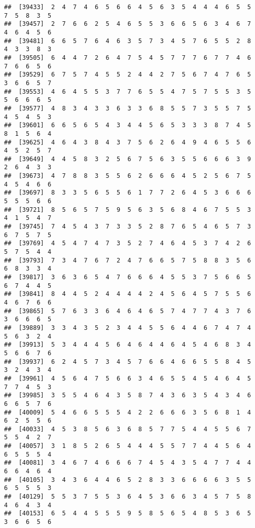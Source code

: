 \documentclass[
]{book}
\begin{document}
\begin{verbatim}
##  [39433]  2  4  7  4  6  5  6  6  4  5  6  3  5  4  4  4  6  5  5  7  5  8  3  5
##  [39457]  2  7  6  6  2  5  4  6  5  5  3  6  6  5  6  3  4  6  7  4  6  4  5  6
##  [39481]  6  6  5  7  6  4  6  3  5  7  3  4  5  7  6  5  5  2  8  4  3  3  8  3
##  [39505]  6  4  4  7  2  6  4  7  5  4  5  7  7  7  6  7  7  4  6  7  6  6  5  6
##  [39529]  6  7  5  7  4  5  5  2  4  4  2  7  5  6  7  4  7  6  5  3  6  6  5  7
##  [39553]  4  6  4  5  5  3  7  7  6  5  5  4  7  5  7  5  5  3  5  5  6  6  6  5
##  [39577]  4  8  3  4  3  3  6  3  3  6  8  5  5  7  3  5  5  7  5  4  5  4  5  3
##  [39601]  6  6  5  6  5  4  3  4  4  5  6  5  3  3  3  8  7  4  5  8  1  5  6  4
##  [39625]  4  6  4  3  8  4  3  7  5  6  2  6  4  9  4  6  5  5  6  4  5  2  5  7
##  [39649]  4  4  5  8  3  2  5  6  7  5  6  3  5  5  6  6  6  3  9  2  6  4  3  3
##  [39673]  4  7  8  8  3  5  5  6  2  6  6  6  4  5  2  5  6  7  5  4  5  4  6  6
##  [39697]  8  3  3  5  6  5  5  6  1  7  7  2  6  4  5  3  6  6  6  5  5  5  6  6
##  [39721]  8  5  6  5  7  5  9  5  6  3  5  6  8  4  6  7  5  5  3  4  1  5  4  7
##  [39745]  7  4  5  4  3  7  3  3  5  2  8  7  6  5  4  6  5  7  3  6  7  5  7  5
##  [39769]  4  5  4  7  4  7  3  5  2  7  4  6  4  5  3  7  4  2  6  5  7  5  4  4
##  [39793]  7  3  4  7  6  7  2  4  7  6  6  5  7  5  8  8  3  5  6  6  8  3  3  4
##  [39817]  3  6  3  6  5  4  7  6  6  6  4  5  5  3  7  5  6  6  5  6  7  4  4  5
##  [39841]  8  4  4  5  2  4  4  4  4  2  4  5  6  4  5  7  5  5  6  4  6  7  6  6
##  [39865]  5  7  6  3  3  6  4  6  4  6  5  7  4  7  7  4  3  7  6  3  6  6  6  5
##  [39889]  3  3  4  3  5  2  3  4  4  5  5  6  4  4  6  7  4  7  4  5  6  3  2  4
##  [39913]  5  3  4  4  4  5  6  4  6  4  4  6  4  5  4  6  8  3  4  5  6  6  7  6
##  [39937]  6  2  4  5  7  3  4  5  7  6  6  4  6  6  5  5  8  4  5  3  2  4  3  4
##  [39961]  4  5  6  4  7  5  6  6  3  4  6  5  5  4  5  4  6  4  5  7  7  4  5  3
##  [39985]  3  5  5  4  6  4  3  5  8  7  4  3  6  3  5  4  3  4  6  6  6  5  7  6
##  [40009]  5  4  6  6  5  5  5  4  2  2  6  6  6  3  5  6  8  1  4  6  2  5  5  6
##  [40033]  4  5  3  8  5  6  3  6  8  5  7  7  5  4  4  5  5  6  7  5  5  4  2  7
##  [40057]  3  1  8  5  2  6  5  4  4  4  5  5  7  7  4  4  5  6  4  6  5  5  5  4
##  [40081]  3  4  6  7  4  6  6  6  7  4  5  4  3  5  4  7  7  4  4  6  6  4  6  4
##  [40105]  3  4  3  6  4  4  6  5  2  8  3  3  6  6  6  6  3  5  5  6  5  5  5  3
##  [40129]  5  5  3  7  5  5  3  6  4  5  3  6  6  3  4  5  7  5  8  4  6  4  3  4
##  [40153]  6  5  4  4  5  5  5  9  5  8  5  6  5  4  8  5  3  6  5  3  6  6  5  6

\end{verbatim}
\end{document}
